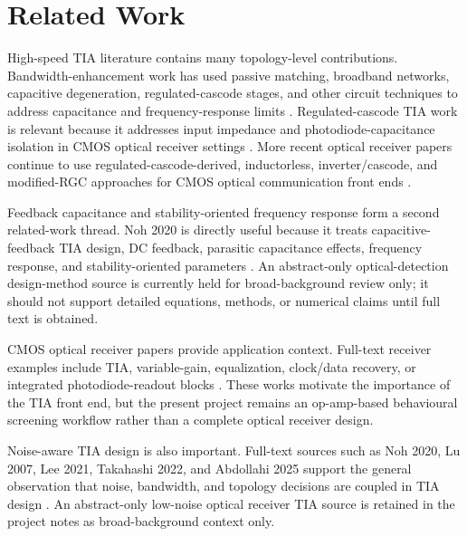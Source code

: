 \section{Related Work}

High-speed TIA literature contains many topology-level contributions. Bandwidth-enhancement work has used passive matching, broadband networks, capacitive degeneration, regulated-cascode stages, and other circuit techniques to address capacitance and frequency-response limits \citep{ANALUI_2004_BW_ENHANCEMENT,LU_2007_BROADBAND_TIA}. Regulated-cascode TIA work is relevant because it addresses input impedance and photodiode-capacitance isolation in CMOS optical receiver settings \citep{PARK_YOO_2004_RGC_TIA}. More recent optical receiver papers continue to use regulated-cascode-derived, inductorless, inverter/cascode, and modified-RGC approaches for CMOS optical communication front ends \citep{XU_2011_INDUCTORLESS_TIA,LEE_2021_4GHZ_SDT_VG_TIA,TAKAHASHI_2022_LOCAL_FEEDBACK_RGC,PAN_LUO_2022_20GBPS_TIA,ABDOLLAHI_2025_MDFRGC_TIA}.

Feedback capacitance and stability-oriented frequency response form a second related-work thread. Noh 2020 is directly useful because it treats capacitive-feedback TIA design, DC feedback, parasitic capacitance effects, frequency response, and stability-oriented parameters \citep{NOH_2020_CF_TIA_DC_LOOP}.
An abstract-only optical-detection design-method source is currently held for broad-background review only; it should not support detailed equations, methods, or numerical claims until full text is obtained.

CMOS optical receiver papers provide application context. Full-text receiver examples include TIA, variable-gain, equalization, clock/data recovery, or integrated photodiode-readout blocks \citep{PAN_2022_26GBPS_RX,MESGARI_2024_MULTI_DOT_PIN_RX}. These works motivate the importance of the TIA front end, but the present project remains an op-amp-based behavioural screening workflow rather than a complete optical receiver design.

Noise-aware TIA design is also important. Full-text sources such as Noh 2020, Lu 2007, Lee 2021, Takahashi 2022, and Abdollahi 2025 support the general observation that noise, bandwidth, and topology decisions are coupled in TIA design \citep{NOH_2020_CF_TIA_DC_LOOP,LU_2007_BROADBAND_TIA,LEE_2021_4GHZ_SDT_VG_TIA,TAKAHASHI_2022_LOCAL_FEEDBACK_RGC,ABDOLLAHI_2025_MDFRGC_TIA}.
An abstract-only low-noise optical receiver TIA source is retained in the project notes as broad-background context only.

